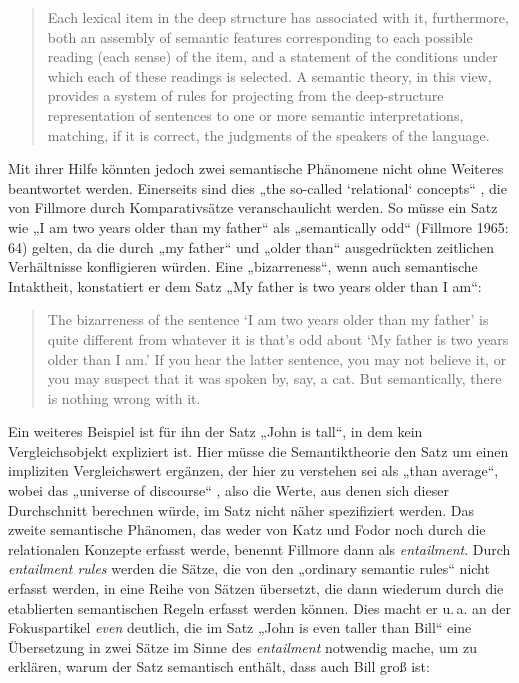 \begin{quote}
Each lexical item in the deep structure has associated with it, furthermore, both an assembly of semantic features corresponding to each possible reading (each sense) of the item, and a statement of the conditions under which each of these readings is selected. A semantic theory, in this view, provides a system of rules for projecting from the deep-structure representation of sentences to one or more semantic interpretations, matching, if it is correct, the judgments of the speakers of the language. \autocite[61-62]{fillmoreEntailmentRulesSemantic1965}
\end{quote}

Mit ihrer Hilfe könnten jedoch zwei semantische Phänomene nicht ohne Weiteres beantwortet werden. Einerseits sind dies „the so-called `relational` concepts`` \autocite[64]{fillmoreEntailmentRulesSemantic1965}, die von Fillmore durch Komparativsätze veranschaulicht werden. So müsse ein Satz wie „I am two years older than my father`` als „semantically odd`` (Fillmore 1965: 64) gelten, da die durch „my father`` und „older than`` ausgedrückten zeitlichen Verhältnisse konfligieren würden. Eine „bizarreness``, wenn auch semantische Intaktheit, konstatiert er dem Satz „My father is two years older than I am``:

\begin{quote}
The bizarreness of the sentence `I am two years older than my father' is quite different from whatever it is that's odd about `My father is two years older than I am.' If you hear the latter sentence, you may not believe it, or you may suspect that it was spoken by, say, a cat. But semantically, there is nothing wrong with it. \autocite[64]{fillmoreEntailmentRulesSemantic1965}
\end{quote}

Ein weiteres Beispiel ist für ihn der Satz „John is tall``, in dem kein Vergleichsobjekt expliziert ist. Hier müsse die Semantiktheorie den Satz um einen impliziten Vergleichswert ergänzen, der hier zu verstehen sei als „than average``, wobei das „universe of discourse`` \autocite[65]{fillmoreEntailmentRulesSemantic1965}, also die Werte, aus denen sich dieser Durchschnitt berechnen würde, im Satz nicht näher spezifiziert werden. Das zweite semantische Phänomen, das weder von Katz und Fodor noch durch die relationalen Konzepte erfasst werde, benennt Fillmore dann als \emph{entailment}. Durch \emph{entailment rules} werden die Sätze, die von den „ordinary semantic rules`` \autocite[65]{fillmoreEntailmentRulesSemantic1965} nicht erfasst werden, in eine Reihe von Sätzen übersetzt, die dann wiederum durch die etablierten semantischen Regeln erfasst werden können. Dies macht er u.\,a. an der Fokuspartikel \emph{even} deutlich, die im Satz „John is even taller than Bill`` \autocite[68]{fillmoreEntailmentRulesSemantic1965} eine Übersetzung in zwei Sätze im Sinne des \emph{entailment} notwendig mache, um zu erklären, warum der Satz semantisch enthält, dass auch Bill groß ist:

